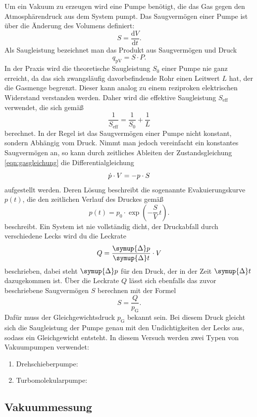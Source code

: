 Um ein Vakuum zu erzeugen wird eine Pumpe benötigt, die das Gas gegen den Atmosphärendruck aus dem System pumpt.
Das Saugvermögen einer Pumpe ist über die Änderung des Volumens definiert:
\begin{equation}
    \label{eqn:saugvermoegen}
    S = \frac{\text{d}V}{\text{d}t}.
\end{equation}
Als Saugleistung bezeichnet man das Produkt aus Saugvermögen und Druck
\begin{equation}
    \label{eqn:saugleistung}
    q_{\text{pV}} = S \cdot P.
\end{equation}
In der Praxis wird die theoretische Saugleistung $S_0$ einer Pumpe nie ganz erreicht, da das sich zwangsläufig davorbefindende
Rohr einen Leitwert $L$ hat, der die Gasmenge begrenzt. Dieser kann analog zu einem reziproken elektrischen Widerstand verstanden werden.
Daher wird die effektive Saugleistung $S_{\text{eff}}$ verwendet, die sich gemäß
\begin{equation}
    \label{eqn:saugleistung_eff}
    \frac{1}{S_{\text{eff}}} = \frac{1}{S_{0}} + \frac{1}{L}
\end{equation}
berechnet. In der Regel ist das Saugvermögen einer Pumpe nicht konstant, sondern Abhängig vom Druck.
Nimmt man jedoch vereinfacht ein konstantes Saugvermögen an, so kann durch zeitliches Ableiten der Zustandsgleichung \eqref{eqn:gasgleichung}
die Differentialgleichung
\begin{equation}
    \notag
    \dot{p} \cdot V = -p \cdot S
\end{equation}
aufgestellt werden. Deren Lösung beschreibt die sogenannte Evakuierungskurve $p(t)$, die den zeitlichen Verlauf des Druckes gemäß
\begin{equation}
    \label{eqn:evakuierungskurve}
    p(t) = p_0 \cdot \exp{\left(-\frac{S}{V}\,t\right)}.
\end{equation}
beschreibt.
Ein System ist nie vollständig dicht, der Druckabfall durch verschiedene Lecks wird du die Leckrate
\begin{equation}
    \label{eqn:leckrate}
    Q = \frac{\symup{\Delta} p}{\symup{\Delta} t}\cdot V
\end{equation}
beschrieben, dabei steht $\symup{\Delta} p$ für den Druck, der in der Zeit $\symup{\Delta} t$ dazugekommen ist.
Über die Leckrate $Q$ lässt sich ebenfalls das zuvor beschriebene Saugvermögen $S$ berechnen mit der Formel
\begin{equation}
    \label{eqn:s_leck}
    S = \frac{Q}{p_{\text{G}}}.
\end{equation}
Dafür muss der Gleichgewichtsdruck $p_{\text{G}}$ bekannt sein. Bei diesem Druck gleicht sich die Saugleistung der Pumpe genau mit den
Undichtigkeiten der Lecks aus, sodass ein Gleichgewicht entsteht. In diesem Versuch werden zwei Typen von Vakuumpumpen verwendet:
\begin{enumerate}
    \item Drehschieberpumpe:
    \item Turbomolekularpumpe:
\end{enumerate}

\subsection{Vakuummessung}
